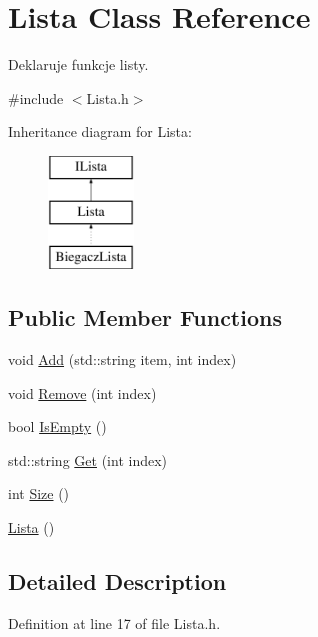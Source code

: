 \hypertarget{class_lista}{\section{Lista Class Reference}
\label{class_lista}
}


Deklaruje funkcje listy.  




{\ttfamily \#include $<$Lista.\-h$>$}

Inheritance diagram for Lista\-:\begin{figure}[H]
\begin{center}
\leavevmode
\includegraphics[height=3.000000cm]{class_lista}
\end{center}
\end{figure}
\subsection*{Public Member Functions}
\begin{DoxyCompactItemize}
\item 
void \hyperlink{class_lista_a9e4d70d858b6e3a646f180457b09aa04}{Add} (std\-::string item, int index)
\item 
void \hyperlink{class_lista_a6c0bd5efbb3cba185a35bd2aa75beb4d}{Remove} (int index)
\item 
bool \hyperlink{class_lista_acceb965602ca6cef206046d40c629395}{Is\-Empty} ()
\item 
std\-::string \hyperlink{class_lista_a46ae62bf7552a2350d8680ba95133a4f}{Get} (int index)
\item 
int \hyperlink{class_lista_abdcf8dfca8c018469b53c30433f7062c}{Size} ()
\item 
\hyperlink{class_lista_a1f668b36909182ef1360b48503529a31}{Lista} ()
\end{DoxyCompactItemize}


\subsection{Detailed Description}


Definition at line 17 of file Lista.\-h.



